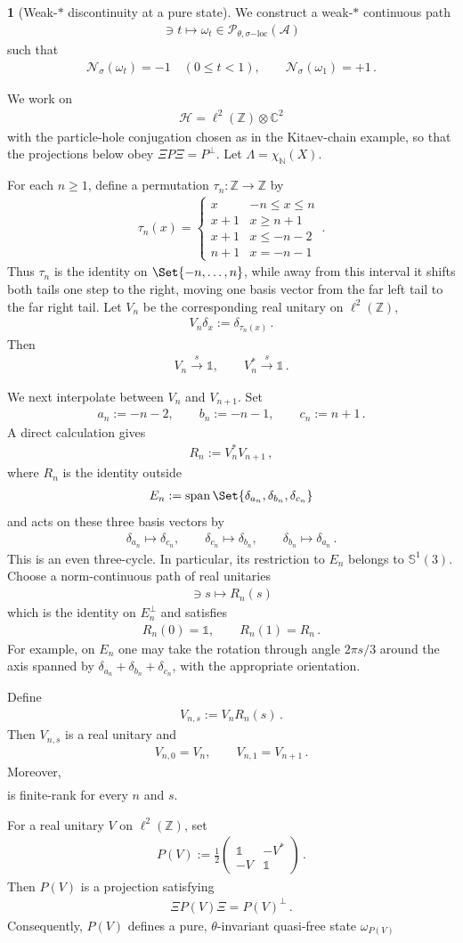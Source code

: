 \documentclass[a4paper,10pt]{article}
\numberwithin{equation}{section}
\theoremstyle{plain}
\theoremstyle{plain}
\theoremstyle{plain}
\theoremstyle{plain}
\theoremstyle{plain}
\theoremstyle{remark}
\theoremstyle{definition}
\newtheorem{example}[example]{\protect\examplename}
\providecommand{\examplename}{Example}
\newcommand{\ZZ}{\mathbb{Z}}
\newcommand{\bS}{\mathbb{S}}
\newcommand{\NN}{\mathbb{N}}
\newcommand{\CC}{\mathbb{C}}
\newcommand{\calA}{\mathcal{A}}
\newcommand{\calN}{\mathcal{N}}
\newcommand{\calH}{\mathcal{H}}
\newcommand{\calP}{\mathcal{P}}
\newcommand{\szpan}{\operatorname{span}}
\newcommand{\Id}{\mathds{1}}
\newcommand{\SO}{\bS^1}
\newcommand{\eq}[1]{\begin{align*}#1\end{align*}}
\newcommand{\onehalf}{\frac{1}{2}}
\begin{document}
\begin{example}[Weak-$*$ discontinuity at a pure state]
We construct a weak-$*$ continuous path
\eq{
[0,1]\ni t\longmapsto\omega_t
\in\calP_{\theta,\sigma\mathrm{-loc}}(\calA)
}
such that
\eq{
\calN_\sigma(\omega_t)=-1
\quad (0\leq t<1),
\qquad
\calN_\sigma(\omega_1)=+1\,.
}

We work on
\eq{
\calH=\ell^2(\ZZ)\otimes\CC^2
}
with the particle-hole conjugation chosen as in the Kitaev-chain example, so
that the projections below obey $\Xi P\Xi=P^\perp$. Let
$\Lambda=\chi_\NN(X)$.

For each $n\geq1$, define a permutation $\tau_n:\ZZ\to\ZZ$ by
\eq{
\tau_n(x)=
\begin{cases}
x & -n\leq x\leq n\\
x+1 & x\geq n+1\\
x+1 & x\leq -n-2\\
n+1 & x=-n-1
\end{cases}\,.
}
Thus $\tau_n$ is the identity on $\Set{-n,\dots,n}$, while away from this
interval it shifts both tails one step to the right, moving one basis vector
from the far left tail to the far right tail. Let $V_n$ be the corresponding
real unitary on $\ell^2(\ZZ)$,
\eq{
V_n\delta_x:=\delta_{\tau_n(x)}\,.
}
Then
\eq{
V_n\stackrel{s}{\longrightarrow}\Id,
\qquad
V_n^*\stackrel{s}{\longrightarrow}\Id\,.
}

We next interpolate between $V_n$ and $V_{n+1}$. Set
\eq{
a_n:=-n-2,
\qquad
b_n:=-n-1,
\qquad
c_n:=n+1\,.
}
A direct calculation gives
\eq{
R_n:=V_n^*V_{n+1}\, ,
}
where $R_n$ is the identity outside
\eq{
E_n:=\szpan\Set{\delta_{a_n},\delta_{b_n},\delta_{c_n}}
}
and acts on these three basis vectors by
\eq{
\delta_{a_n}\longmapsto\delta_{c_n},
\qquad
\delta_{c_n}\longmapsto\delta_{b_n},
\qquad
\delta_{b_n}\longmapsto\delta_{a_n}\,.
}
This is an even three-cycle. In particular, its restriction to $E_n$ belongs
to $\SO(3)$. Choose a norm-continuous path of real unitaries
\eq{
[0,1]\ni s\longmapsto R_n(s)
}
which is the identity on $E_n^\perp$ and satisfies
\eq{
R_n(0)=\Id,
\qquad
R_n(1)=R_n\,.
}
For example, on $E_n$ one may take the rotation through angle $2\pi s/3$
around the axis spanned by
$\delta_{a_n}+\delta_{b_n}+\delta_{c_n}$, with the appropriate orientation.

Define
\eq{
V_{n,s}:=V_nR_n(s)\,.
}
Then $V_{n,s}$ is a real unitary and
\eq{
V_{n,0}=V_n,
\qquad
V_{n,1}=V_{n+1}\,.
}
Moreover,
\eq{
[V_{n,s},\Lambda]
}
is finite-rank for every $n$ and $s$.

For a real unitary $V$ on $\ell^2(\ZZ)$, set
\eq{
P(V)
:=
\onehalf
\begin{pmatrix}
\Id & -V^*\\
-V & \Id
\end{pmatrix}\,.
}
Then $P(V)$ is a projection satisfying
\eq{
\Xi P(V)\Xi=P(V)^\perp\,.
}
Consequently, $P(V)$ defines a pure, $\theta$-invariant quasi-free state
$\omega_{P(V)}$


\end{example}
\end{document}
